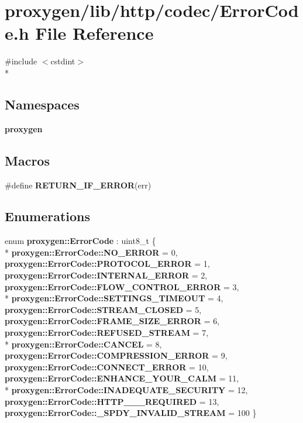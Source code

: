 \section{proxygen/lib/http/codec/\+Error\+Code.h File Reference}
\label{ErrorCode_8h}
{\ttfamily \#include $<$cstdint$>$}\\*
\subsection*{Namespaces}
\begin{DoxyCompactItemize}
\item 
 {\bf proxygen}
\end{DoxyCompactItemize}
\subsection*{Macros}
\begin{DoxyCompactItemize}
\item 
\#define {\bf R\+E\+T\+U\+R\+N\+\_\+\+I\+F\+\_\+\+E\+R\+R\+OR}(err)
\end{DoxyCompactItemize}
\subsection*{Enumerations}
\begin{DoxyCompactItemize}
\item 
enum {\bf proxygen\+::\+Error\+Code} \+: uint8\+\_\+t \{ \\*
{\bf proxygen\+::\+Error\+Code\+::\+N\+O\+\_\+\+E\+R\+R\+OR} = 0, 
{\bf proxygen\+::\+Error\+Code\+::\+P\+R\+O\+T\+O\+C\+O\+L\+\_\+\+E\+R\+R\+OR} = 1, 
{\bf proxygen\+::\+Error\+Code\+::\+I\+N\+T\+E\+R\+N\+A\+L\+\_\+\+E\+R\+R\+OR} = 2, 
{\bf proxygen\+::\+Error\+Code\+::\+F\+L\+O\+W\+\_\+\+C\+O\+N\+T\+R\+O\+L\+\_\+\+E\+R\+R\+OR} = 3, 
\\*
{\bf proxygen\+::\+Error\+Code\+::\+S\+E\+T\+T\+I\+N\+G\+S\+\_\+\+T\+I\+M\+E\+O\+UT} = 4, 
{\bf proxygen\+::\+Error\+Code\+::\+S\+T\+R\+E\+A\+M\+\_\+\+C\+L\+O\+S\+ED} = 5, 
{\bf proxygen\+::\+Error\+Code\+::\+F\+R\+A\+M\+E\+\_\+\+S\+I\+Z\+E\+\_\+\+E\+R\+R\+OR} = 6, 
{\bf proxygen\+::\+Error\+Code\+::\+R\+E\+F\+U\+S\+E\+D\+\_\+\+S\+T\+R\+E\+AM} = 7, 
\\*
{\bf proxygen\+::\+Error\+Code\+::\+C\+A\+N\+C\+EL} = 8, 
{\bf proxygen\+::\+Error\+Code\+::\+C\+O\+M\+P\+R\+E\+S\+S\+I\+O\+N\+\_\+\+E\+R\+R\+OR} = 9, 
{\bf proxygen\+::\+Error\+Code\+::\+C\+O\+N\+N\+E\+C\+T\+\_\+\+E\+R\+R\+OR} = 10, 
{\bf proxygen\+::\+Error\+Code\+::\+E\+N\+H\+A\+N\+C\+E\+\_\+\+Y\+O\+U\+R\+\_\+\+C\+A\+LM} = 11, 
\\*
{\bf proxygen\+::\+Error\+Code\+::\+I\+N\+A\+D\+E\+Q\+U\+A\+T\+E\+\_\+\+S\+E\+C\+U\+R\+I\+TY} = 12, 
{\bf proxygen\+::\+Error\+Code\+::\+H\+T\+T\+P\+\_\+\_\+\_\+\+R\+E\+Q\+U\+I\+R\+ED} = 13, 
{\bf proxygen\+::\+Error\+Code\+::\+\_\+\+S\+P\+D\+Y\+\_\+\+I\+N\+V\+A\+L\+I\+D\+\_\+\+S\+T\+R\+E\+AM} = 100
 \}
\end{DoxyCompactItemize}
